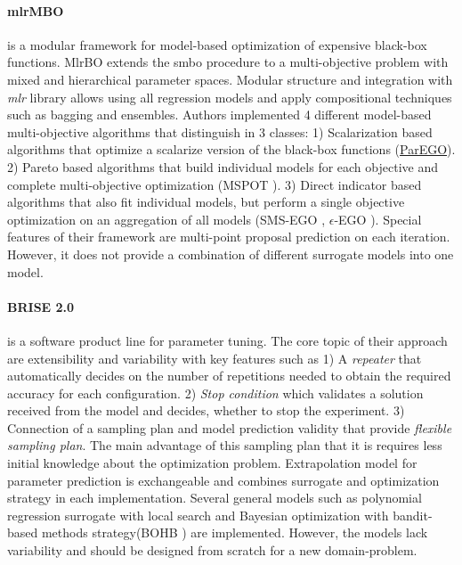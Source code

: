         \paragraph{mlrMBO}\cite{BischlmlrMBO} is a modular framework for model-based optimization of expensive black-box functions. MlrBO extends the \gls{smbo} procedure to a multi-objective problem with mixed and hierarchical parameter spaces. Modular structure and integration with \emph{mlr} library allows using all regression models and apply compositional techniques such as bagging and ensembles. Authors implemented 4 different model-based multi-objective algorithms that distinguish in 3 classes: 1) Scalarization based algorithms that optimize a scalarize version of the black-box functions (\hyperref[alg:ParEGO]{ParEGO}). 2) Pareto based algorithms that build individual models for each objective and complete multi-objective optimization (MSPOT \cite{ZaeffererBNWE13}). 3) Direct indicator based algorithms that also fit individual models, but perform a single objective optimization on an aggregation of all models (SMS-EGO \cite{inproceedings}, $\epsilon$-EGO \cite{WagEGOe}).
        Special features of their framework are multi-point proposal prediction on each iteration. However, it does not provide a combination of different surrogate models into one model.
       

        \paragraph{BRISE 2.0} \cite{Pukhkaiev19} is a software product line for parameter tuning. The core topic of their approach are extensibility and variability with key features such as 1) A \emph{repeater} that automatically decides on the number of repetitions needed to obtain the required accuracy for each configuration. 2) \emph{Stop condition} which validates a solution received from the model and decides, whether to stop the experiment. 3) Connection of a sampling plan and model prediction validity that provide \emph{flexible sampling plan}. The main advantage of this sampling plan that it is requires less initial knowledge about the optimization problem.
        Extrapolation model for parameter prediction is exchangeable and combines surrogate and optimization strategy in each implementation. Several general models such as polynomial regression surrogate with local search and Bayesian optimization with bandit-based methods strategy(BOHB \cite{FalknerBOHB}) are implemented.  However, the models lack variability and should be designed from scratch for a new domain-problem.


